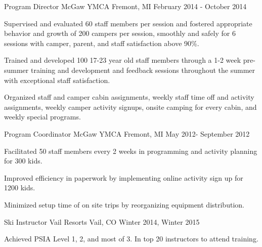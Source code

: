 

\begin{cventries}

  \cventry
    {Program Director} %
    {McGaw YMCA} %
    {Fremont, MI} %
    {February 2014 - October 2014} %
    {
      \begin{cvitems} %
        \item {Supervised and evaluated 60 staff members per session and fostered appropriate behavior and growth of 200 campers per session, smoothly and safely for 6 sessions with camper, parent, and staff satisfaction above 90\%.}
        \item {Trained and developed 100 17-23 year old staff members through a 1-2 week pre-summer training and development and feedback sessions throughout the summer with exceptional staff satisfaction.}
        \item {Organized staff and camper cabin assignments, weekly staff time off and activity assignments, weekly camper activity signups, onsite camping for every cabin, and weekly special programs.}
      \end{cvitems}
    }
    
  \cventry
    {Program Coordinator} %
    {McGaw YMCA} %
    {Fremont, MI} %
    {May 2012- September 2012} %
    {
      \begin{cvitems} %
        \item {Facilitated 50 staff members every 2 weeks in programming and activity planning for 300 kids.}
        \item {Improved efficiency in paperwork by implementing online activity sign up for 1200 kids.}
        \item {Minimized setup time of on site trips by reorganizing equipment distribution.}
      \end{cvitems}
    }

 \cventry
    {Ski Instructor} %
    {Vail Resorts} %
    {Vail, CO} %
    {Winter 2014, Winter 2015} %
    {
      \begin{cvitems} %
        \item {Achieved PSIA Level 1, 2, and most of 3. In top 20 instructors to attend training.}
      \end{cvitems}
    }



\end{cventries}
